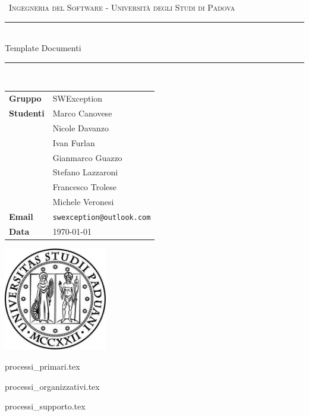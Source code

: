 \documentclass[12pt,italian,a4paper]{article}
\begin{document}
	
	
	\begin{titlepage}
		\clearpage\thispagestyle{empty}
		\centering
		\vspace{1cm}
		
		{\
			\textsc{Ingegneria del Software - Università degli Studi di Padova}
		}
		\vspace{2.5cm}
		
		\rule{\linewidth}{2mm} \\[0.8cm]
		{ \LARGE \sc Template Documenti}\\[0.55cm]
		\rule{\linewidth}{0.6mm} \\[3.4cm]
		
		\hspace{2cm}
		\begin{tabular}{l p{5cm}}
			\textbf{Gruppo} & SWException \\[10pt]
			\textbf{Studenti} & Marco Canovese \\ & Nicole Davanzo \\ & Ivan Furlan \\ & Gianmarco Guazzo \\ & Stefano Lazzaroni \\ & Francesco Trolese \\ & Michele Veronesi \\[10pt]
			\textbf{Email} & \texttt{swexception@outlook.com} \\[10pt]
			\textbf{Data} & \today \\            
		\end{tabular}
		
		
		\vfill
		\centering \includegraphics[width=4.5cm]{logo.jpg}\\ %
		\vspace{0.5cm}
	\end{titlepage}
	\tableofcontents
	
	\newpage
	

	{processi_primari.tex}

	{processi_organizzativi.tex}
	
	{processi_supporto.tex}
\end{document}
